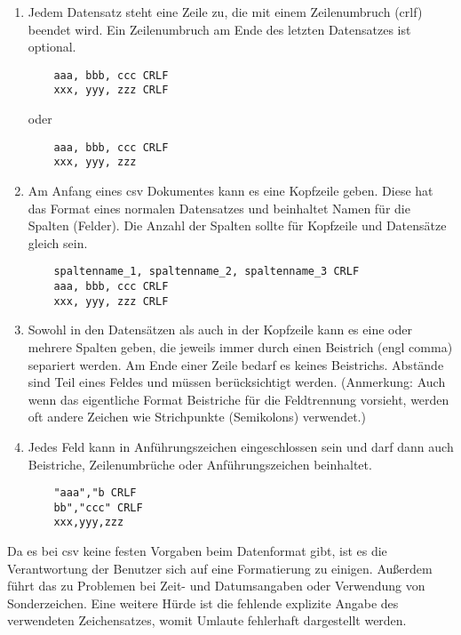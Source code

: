 \begin{enumerate}{}
	
	\item Jedem Datensatz steht eine Zeile zu, die mit einem Zeilenumbruch (\ac{crlf}) beendet wird. Ein Zeilenumbruch am Ende des letzten Datensatzes ist optional. \zB 
	\begin{lstlisting}
	aaa, bbb, ccc CRLF
	xxx, yyy, zzz CRLF
	\end{lstlisting}
	oder
	\begin{lstlisting}
	aaa, bbb, ccc CRLF
	xxx, yyy, zzz
	\end{lstlisting}
	
	\item Am Anfang eines \acs{csv} Dokumentes kann es eine Kopfzeile geben. Diese hat das Format eines normalen Datensatzes und beinhaltet Namen für die Spalten (Felder). Die Anzahl der Spalten sollte für Kopfzeile und Datensätze gleich sein. \zB
	\begin{lstlisting}
	spaltenname_1, spaltenname_2, spaltenname_3 CRLF
	aaa, bbb, ccc CRLF
	xxx, yyy, zzz CRLF
	\end{lstlisting}
	
	\item Sowohl in den Datensätzen als auch in der Kopfzeile kann es eine oder mehrere Spalten geben, die jeweils immer durch einen Beistrich (\acs{engl} comma) separiert werden. Am Ende einer Zeile bedarf es keines Beistrichs. Abstände sind Teil eines Feldes und müssen berücksichtigt werden. (Anmerkung: Auch wenn das eigentliche Format Beistriche für die Feldtrennung vorsieht, werden oft andere Zeichen wie \zB Strichpunkte (Semikolons) verwendet.)
	
	\item Jedes Feld kann in Anführungszeichen eingeschlossen sein und darf dann auch Beistriche, Zeilenumbrüche oder Anführungszeichen beinhaltet. \zB
	\begin{lstlisting}
	"aaa","b CRLF
	bb","ccc" CRLF
	xxx,yyy,zzz
	\end{lstlisting}
	
\end{enumerate}

Da es bei \acs{csv} keine festen Vorgaben beim Datenformat gibt, ist es die Verantwortung der Benutzer sich auf eine Formatierung zu einigen. Außerdem führt das zu Problemen bei Zeit- und Datumsangaben oder Verwendung von Sonderzeichen. Eine weitere Hürde ist die fehlende explizite Angabe des verwendeten Zeichensatzes, womit \zB Umlaute fehlerhaft dargestellt werden. \cite{FuchsMediaSolutions:o.J.}

